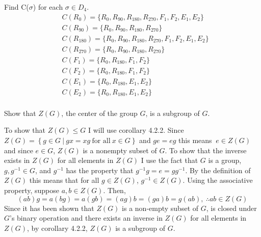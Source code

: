 \documentclass[titlepage]{article}
\newenvironment{problem}[2][Problem]{\begin{trivlist}
\item[\hskip \labelsep {\bfseries #1}\hskip \labelsep {\bfseries #2.}]}{\end{trivlist}}
\begin{document}
 
 
\fancyhf{}
\cfoot{\thepage}

\begin{problem}{1}
Find C($\sigma$) for each $\sigma \in D_4$. 
\begin{align*}
&C(R_0) = \{R_0, R_{90}, R_{180}, R_{270}, F_1, F_2, E_1, E_2\}\\
&C(R_{90}) = \{R_0, R_{90}, R_{180},R_{270}\}\\
&C(R_{180}) = \{R_0, R_{90}, R_{180},R_{270}, F_1, F_2, E_1, E_2\}\\
&C(R_{270}) = \{R_0, R_{90}, R_{180},R_{270}\} \\
&C(F_1) = \{R_0, R_{180}, F_1,F_2\}\\
&C(F_2) = \{R_0, R_{180}, F_1,F_2\}\\
&C(E_1) = \{R_0, R_{180}, E_1, E_2\}\\
&C(E_2) = \{R_0, R_{180}, E_1, E_2\}\\
\end{align*}
\end{problem}
\begin{problem}{2}
Show that $Z(G)$, the center of the group $G$, is a subgroup of $G$.

To show that $Z(G) \leq G$ I will use corollary 4.2.2. Since $Z(G) = \left\{g \in G \ | \ gx = xg \  \text{for all} \ x \in G \right\}$ and $ge = eg$ this means $\ e \in Z(G)$ and since $e \in G$, $Z(G)$ is a nonempty subset of $G$. To show that the inverse exists in $Z(G)$ for all elements in $Z(G)$ I use the fact that $G$ is a group, $g,g^{-1} \in G$, and $g^{-1}$ has the property that $g^{-1}g = e = gg^{-1}$. By the definition of $Z(G)$ this means that for all $g \in Z(G)$, $g^{-1} \in Z(G)$. Using the associative property, suppose $a,b \in Z(G)$. Then, $$ (ab)g = a(bg) = a(gb) = (ag)b = (ga)b = g(ab), \ \therefore ab \in Z(G)$$  
Since it has been shown that $Z(G)$ is a non-empty subset of $G$, is closed under $G$'s binary operation and there exists an inverse in $Z(G)$ for all elements in $Z(G)$, by corollary 4.2.2, $Z(G)$ is a subgroup of $G$.
\end{problem} 
\end{document}
